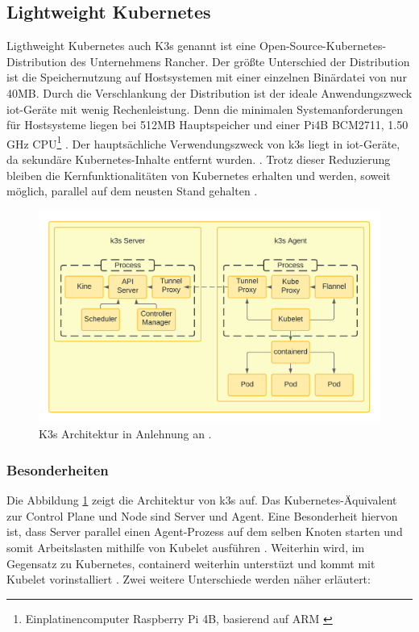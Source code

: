 \subsection{Lightweight Kubernetes} \label{k3s}
Ligthweight Kubernetes auch K3s genannt ist eine Open-Source-Kubernetes-Distributi\-on des Unternehmens
Rancher. Der größte Unterschied der Distribution ist die Speichernutzung 
auf Hostsystemen mit einer einzelnen Binärdatei von nur 40MB.
Durch die Verschlankung der Distribution ist der ideale Anwendungszweck \acs{iot}-Geräte mit wenig Rechenleistung.
Denn die minimalen Systemanforderungen für Hostsysteme liegen bei 512MB Hauptspeicher und einer Pi4B BCM2711, 1.50 GHz CPU\footnote{Einplatinencomputer Raspberry Pi 4B, basierend auf ARM \cite{pi4} } \cite{k3sAnforderung}.
Der hauptsächliche Verwendungszweck von k3s liegt in \acs{iot}-Geräte, da sekundäre Kubernetes-Inhalte entfernt wurden. \cite{k3s}.
Trotz dieser Reduzierung bleiben die Kernfunktionalitäten von Kubernetes erhalten und werden, 
soweit möglich, parallel auf dem neusten Stand gehalten \cite{k3sgit}.

\begin{figure}
  \centering
  \includegraphics[width=1.0\columnwidth]{images/K3sArchitektur.png}
  \caption{K3s Architektur in Anlehnung an \cite{k3s}.}
  \label{fig:k3sarchitektur}
\end{figure}

\subsubsection{Besonderheiten}
Die Abbildung \ref{fig:k3sarchitektur} zeigt die Architektur von k3s auf. Das Kubernetes-Äquivalent zur Control Plane und Node
sind Server und Agent. Eine Besonderheit hiervon ist, dass Server parallel einen Agent-Prozess auf dem selben Knoten starten und
somit Arbeitslasten mithilfe von Kubelet ausführen \cite{k3sServerAgent}. Weiterhin wird, im Gegensatz zu Kubernetes, containerd weiterhin unterstüzt und
kommt mit Kubelet vorinstalliert \cite{k3s}. Zwei weitere Unterschiede werden näher erläutert:

